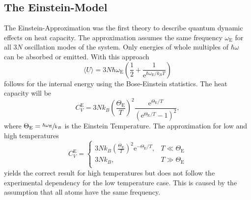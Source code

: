 \subsection{The Einstein-Model}
\label{subsec:Einstein}
The Einstein-Approximation was the first theory to describe quantum dynamic effects on heat capacity.
The approximation assumes the same frequency $\omega_\text{E}$ for all $3N$ oscillation modes of the system. Only energies of whole multiples of
$\hbar \omega$ can be absorbed or emitted. With this approach
\begin{equation*}
    \langle U \rangle = 3N \hbar \omega_\text{E} \left(\frac{1}{2} + \frac{1}{\mathrm{e}^{\hbar \omega_\text{E}/k_BT}}\right)
\end{equation*}
follows for the internal energy using the Bose-Einstein statistics.
The heat capacity will be
\begin{equation}
    \label{eqn:CV_Einstein}
    C^\text{E}_V = 3Nk_B \left(\frac{\Theta_\text{E}}{T}\right)^2 \frac{\mathrm{e}^{\Theta_\text{E}/T}}{\left(\mathrm{e}^{\Theta_\text{E}/T} -1 \right)^2},
\end{equation}
where $\Theta_\text{E} = \sfrac{\hbar \omega_\text{E}}{k_B}$ is the Einstein Temperature.
The approximation for low and high temperatures
\begin{equation*}
    C^\text{E}_V =
    \begin{cases}
        3Nk_B\left(\frac{\Theta_\text{E}}{T}\right)^2 \mathrm{e}^{-\Theta_\text{E}/T}, & T \ll \Theta_\text{E}\\
        3Nk_B, & T \gg \Theta_\text{E}\\
    \end{cases}
\end{equation*}
yields the correct result for high temperatures but does not follow the experimental dependency for the low temperature case.
This is caused by the assumption that all atoms have the same frequency.

